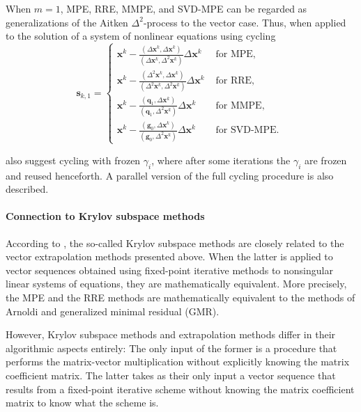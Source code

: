 When \(m=1\), MPE, RRE, MMPE, and SVD-MPE can be regarded as generalizations of the Aitken \(\Delta^2\)-process to the vector case.
Thus, when applied to the solution of a system of nonlinear equations using cycling
\begin{equation}
\mathbf{s}_{k, 1}=\begin{cases}
\mathbf x^{k}-\displaystyle\frac{\left(\Delta \mathbf x^{k}, \Delta \mathbf x^{k}\right)}{\left(\Delta \mathbf x^{k}, \Delta^{2} \mathbf x^{k}\right)} \Delta \mathbf x^{k} & \text { for MPE, } \\[10pt]
\mathbf x^{k}-\displaystyle\frac{\left(\Delta^{2} \mathbf x^{k}, \Delta\mathbf  x^{k}\right)}{\left(\Delta^{2} \mathbf x^{k}, \Delta^{2} \mathbf x^{k}\right)} \Delta \mathbf x^{k} & \text { for RRE, } \\[10pt]
\mathbf x^{k}-\displaystyle\frac{\left(\mathbf  q_{1}, \Delta \mathbf x^{k}\right)}{\left(\mathbf  q_{1}, \Delta^{2} \mathbf  x^{k}\right)} \Delta \mathbf x^{k} & \text { for MMPE, } \\[10pt]
\mathbf x^{k}-\displaystyle\frac{\left(\mathbf g_{0}, \Delta\mathbf x^{k}\right)}{\left( \mathbf g_{0}, \Delta^{2} \mathbf x^{k}\right)} \Delta \mathbf  x^{k} & \text { for SVD-MPE. }
\end{cases}
\end{equation}

\cite{sidi_vector_2017} also suggest cycling with frozen \(\gamma_i\), where after some iterations the \(\gamma_i\) are frozen and reused henceforth.
A parallel version of the full cycling procedure is also described.

\paragraph{Connection to Krylov subspace methods}

According to \cite{sidi_vector_2017}, the so-called Krylov subspace methods are closely related to the vector extrapolation methods presented above.
When the latter is applied to vector sequences obtained using fixed-point iterative methods to nonsingular linear systems of equations, they are mathematically equivalent.
More precisely, the MPE and the RRE methods are mathematically equivalent to the methods of Arnoldi and generalized minimal residual (GMR).

However, Krylov subspace methods and extrapolation methods differ in their algorithmic aspects entirely:
The only input of the former is a procedure that performs the matrix-vector multiplication without explicitly knowing the matrix coefficient matrix.
The latter takes as their only input a vector sequence that results from a fixed-point iterative scheme without knowing the matrix coefficient matrix to know what the scheme is.


